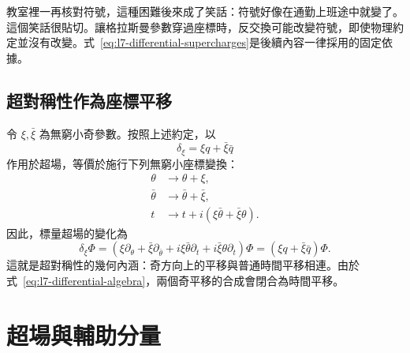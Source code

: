 教室裡一再核對符號，這種困難後來成了笑話：符號好像在通勤上班途中就變了。這個笑話很貼切。讓格拉斯曼參數穿過座標時，反交換可能改變符號，即使物理約定並沒有改變。式~\eqref{eq:l7-differential-supercharges}是後續內容一律採用的固定依據。

\subsection{超對稱性作為座標平移}

令 \(\xi,\bar\xi\) 為無窮小奇參數。按照上述約定，以
\begin{equation}
\delta_\xi=\xi q+\bar\xi\bar q
\end{equation}
作用於超場，等價於施行下列無窮小座標變換：
\begin{align}
\theta&\longrightarrow\theta+\xi,\\
\bar\theta&\longrightarrow\bar\theta+\bar\xi,\\
t&\longrightarrow t+i\left(\xi\bar\theta+\bar\xi\theta\right).
\label{eq:l7-coordinate-shift}
\end{align}
因此，標量超場的變化為
\begin{equation}
\delta_\xi\Phi
=\left(\xi\partial_\theta+\bar\xi\partial_{\bar\theta}
+i\xi\bar\theta\partial_t+i\bar\xi\theta\partial_t\right)\Phi
=\left(\xi q+\bar\xi\bar q\right)\Phi.
\end{equation}
這就是超對稱性的幾何內涵：奇方向上的平移與普通時間平移相連。由於式~\eqref{eq:l7-differential-algebra}，兩個奇平移的合成會閉合為時間平移。

\begin{classroomqa}
\end{classroomqa}

\begin{classroomqa}
\end{classroomqa}

\section{超場與輔助分量}

